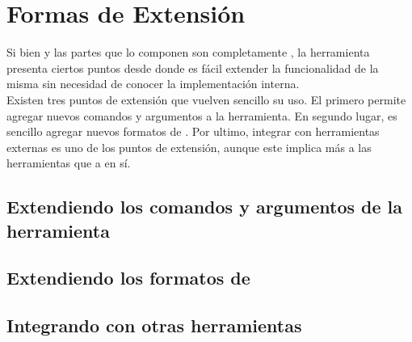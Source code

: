 \section{Formas de Extensión}

Si bien \fronttier y las partes que lo componen son completamente
\opensource, la herramienta presenta ciertos puntos desde donde es
fácil extender la funcionalidad de la misma sin necesidad de conocer
la implementación interna.\\
Existen tres puntos de extensión que vuelven sencillo su uso. El
primero permite agregar nuevos comandos y argumentos a la herramienta.
En segundo lugar, es sencillo agregar nuevos formatos de \conffiles.
Por ultimo, integrar \fronttier con herramientas externas es uno
de los puntos de extensión, aunque este implica más a las herramientas
que a \fronttier en sí.\\

\subsection{Extendiendo los comandos y argumentos de la herramienta}

\subsection{Extendiendo los formatos de \conffile}

\subsection{Integrando con otras herramientas}